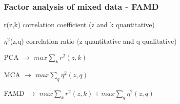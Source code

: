\documentclass[compress]{beamer}
\begin{document}
\begin{frame}
\frametitle{Factor analysis of mixed data - FAMD}
\begin{center}
r(z,k) correlation coefficient (z and k quantitative) \\
\end{center}
\begin{center}
$\eta^{2}$(z,q) correlation ratio (z quantitative and q qualitative)
\end{center}
\begin{center}
PCA $\rightarrow$ $max\sum_{k}r^{2}(z,k)$
\end{center}
\begin{center}
MCA $\rightarrow$ $max\sum_{q}\eta^{2}(z,q)$
\end{center}
\begin{center}
FAMD $\rightarrow$ $max\sum_{k}r^{2}(z,k)+max\sum_{q}\eta^{2}(z,q)$
\end{center}
\end{frame}
\end{document}
